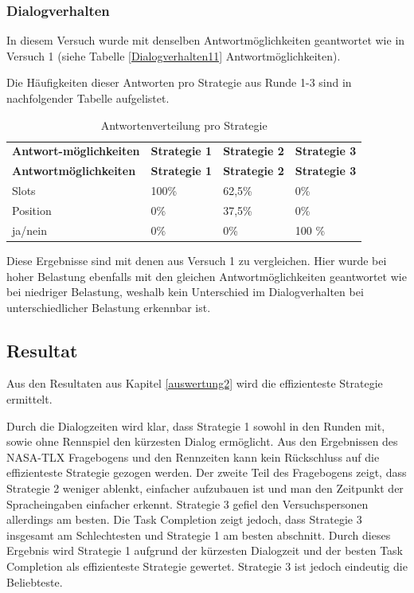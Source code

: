 \documentclass[12pt,a4paper]{scrartcl}
\begin{document}
\subsubsection{Dialogverhalten}
\label{DV2}
In diesem Versuch wurde mit denselben Antwortmöglichkeiten geantwortet wie in Versuch 1 (siehe Tabelle \ref{Dialogverhalten11} Antwortmöglichkeiten).

Die Häufigkeiten dieser Antworten pro Strategie aus Runde 1-3 sind in nachfolgender Tabelle aufgelistet.

\begin{longtable}{p{3cm}p{3cm}p{3cm}p{3cm} }
	\label{Dialogverhalten12}\\
	\caption[Antwortenverteilung pro Strategie]{Antwortenverteilung pro Strategie}\\
	\hline
\textbf{Antwort-möglichkeiten}&\textbf{Strategie 1}&\textbf{Strategie 2} &\textbf{Strategie 3}\\
	\hline
	\endfirsthead
	\hline
	\textbf{Antwortmöglichkeiten}&\textbf{Strategie 1}&\textbf{Strategie 2} &\textbf{Strategie 3}\\
	\hline
	\endhead
Slots & 100\% & 62,5\%\ & 0\%  \\
Position & 0\% & 37,5\% & 0\%  \\
ja/nein & 0\% & 0\%  & 100 \%  \\
\hline
\end{longtable}
Diese Ergebnisse sind mit denen aus Versuch 1 zu vergleichen. 
Hier wurde bei hoher Belastung ebenfalls mit den gleichen Antwortmöglichkeiten geantwortet wie bei niedriger Belastung, weshalb kein Unterschied im Dialogverhalten bei unterschiedlicher Belastung erkennbar ist. 




\subsection{Resultat}
Aus den Resultaten aus Kapitel \ref{auswertung2} wird die effizienteste Strategie ermittelt. \newline

Durch die Dialogzeiten wird klar, dass Strategie 1 sowohl in den Runden mit, sowie ohne Rennspiel den kürzesten Dialog ermöglicht. Aus den Ergebnissen des NASA-TLX Fragebogens und den Rennzeiten kann kein Rückschluss auf die effizienteste Strategie gezogen werden. Der zweite Teil des Fragebogens zeigt, dass Strategie 2 weniger ablenkt, einfacher aufzubauen ist und man den Zeitpunkt der Spracheingaben einfacher erkennt. Strategie 3 gefiel den Versuchspersonen allerdings am besten. Die Task Completion zeigt jedoch, dass Strategie 3 insgesamt am Schlechtesten und Strategie 1 am besten abschnitt. \newline
Durch dieses Ergebnis wird Strategie 1 aufgrund der kürzesten Dialogzeit und der besten Task Completion als effizienteste Strategie gewertet. Strategie 3 ist jedoch eindeutig die Beliebteste. 
\end{document}
